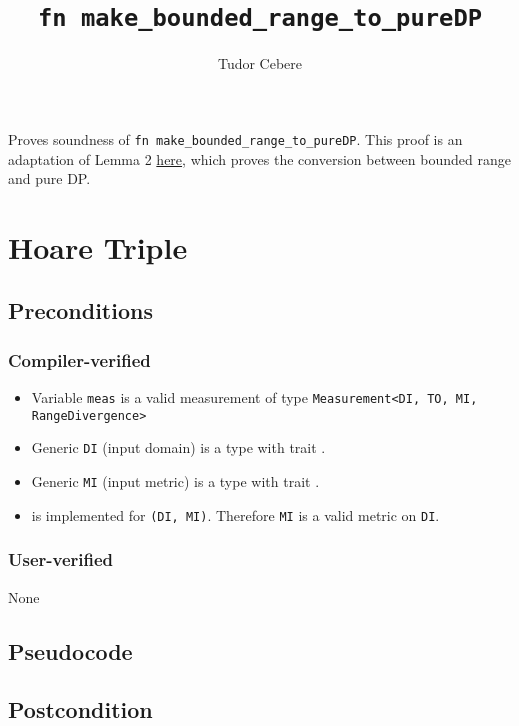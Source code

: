 \documentclass{article}
\title{\texttt{fn make\_bounded\_range\_to\_pureDP}}
\author{Tudor Cebere}
\begin{document}
\maketitle

\contrib
Proves soundness of \texttt{fn make\_bounded\_range\_to\_pureDP}. %
This proof is an adaptation of Lemma 2 \href{https://differentialprivacy.org/exponential-mechanism-bounded-range/}{here}, 
which proves the conversion between bounded range \cite{durfee2019practical} and pure DP.

\section{Hoare Triple}
\subsection*{Preconditions}
\subsubsection*{Compiler-verified}
\begin{itemize}
    \item Variable \texttt{meas} is a valid measurement of type \texttt{Measurement<DI, TO, MI, RangeDivergence>}
    \item Generic \texttt{DI} (input domain) is a type with trait . 
    \item Generic \texttt{MI} (input metric) is a type with trait .
    \item {} is implemented for \texttt{(DI, MI)}. Therefore \texttt{MI} is a valid metric on \texttt{DI}.
\end{itemize}

\subsubsection*{User-verified}
None

\subsection*{Pseudocode}



\subsection*{Postcondition}
\end{document}

